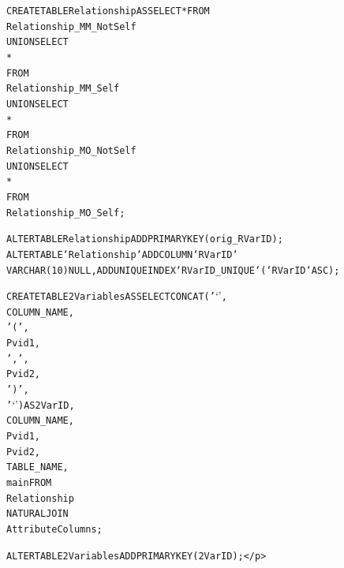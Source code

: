 \documentclass{sfuthesis}
\begin{document}
\begin{appendices}
\begin{alltt}
CREATE TABLE Relationship AS SELECT * FROM  
Relationship_MM_NotSelf    
UNION SELECT            
*                   
FROM
Relationship_MM_Self 
UNION SELECT 
*
FROM
Relationship_MO_NotSelf 
UNION SELECT 
*
FROM
Relationship_MO_Self;

ALTER TABLE Relationship ADD PRIMARY KEY (orig_RVarID);
ALTER TABLE `Relationship` ADD COLUMN `RVarID` 
	VARCHAR(10) NULL , ADD UNIQUE INDEX `RVarID_UNIQUE` (`RVarID` ASC) ; 


CREATE TABLE 2Variables AS SELECT CONCAT('`',
        COLUMN_NAME,
        '(',
        Pvid1,
        ',',
        Pvid2,
        ')',
        '`') AS 2VarID,
COLUMN_NAME,
Pvid1,
Pvid2,
TABLE_NAME,
main FROM
Relationship
    NATURAL JOIN
AttributeColumns;

ALTER TABLE 2Variables ADD PRIMARY KEY (2VarID);</p>\end{alltt}

%
%




\end{appendices}
\end{document}
